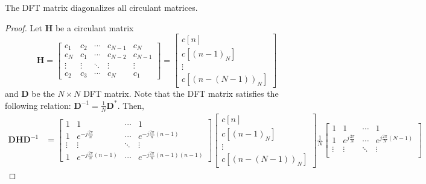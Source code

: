 \documentclass{article}
\begin{document}
\begin{theorem}
    The DFT matrix diagonalizes all circulant matrices.
\end{theorem}
\begin{proof}
    Let \(\bm{H}\) be a circulant matrix
    \begin{equation}
        \bm{H} =
        \begin{bmatrix}
            c_1 & c_2 & \cdots & c_{N - 1} & c_N \\
            c_N & c_1 & \cdots & c_{N - 2} & c_{N - 1} \\
            \vdots & \vdots & \ddots & \vdots & \vdots \\
            c_2 & c_3 & \cdots & c_N & c_1
        \end{bmatrix} =
        \begin{bmatrix}
            c[n] \\
            c[(n - 1)_N] \\
            \vdots \\
            c[(n - (N - 1))_N]
        \end{bmatrix}
    \end{equation}
    and \(\bm{D}\) be the \(N \times N\) DFT matrix.
    Note that the DFT matrix satisfies the following relation: \(\bm{D}^{-1} = \frac{1}{N} \bm{D}^\ast\).
    Then,
    \begin{align}
        \bm{D} \bm{H} \bm{D}^{-1} &=
        \begin{bmatrix}
            1 & 1 & \cdots & 1 \\
            1 & e^{-j \frac{2\pi}{n}} & \cdots & e^{-j \frac{2\pi}{n} (n - 1)} \\
            \vdots & \vdots & \ddots & \vdots \\
            1 & e^{-j \frac{2\pi}{n} (n - 1)} & \cdots & e^{-j \frac{2\pi}{n} (n - 1) (n - 1)}
        \end{bmatrix}
        \begin{bmatrix}
            c[n] \\
            c[(n - 1)_N] \\
            \vdots \\
            c[(n - (N - 1))_N]
        \end{bmatrix}
        \frac{1}{N} \begin{bmatrix}
            1 & 1 & \cdots & 1 \\
            1 & e^{j \frac{2\pi}{N}} & \cdots & e^{j \frac{2\pi}{N} (N - 1)} \\
            \vdots & \vdots & \ddots & \vdots \\

\end{bmatrix}
\end{align}
\end{proof}
\end{document}
